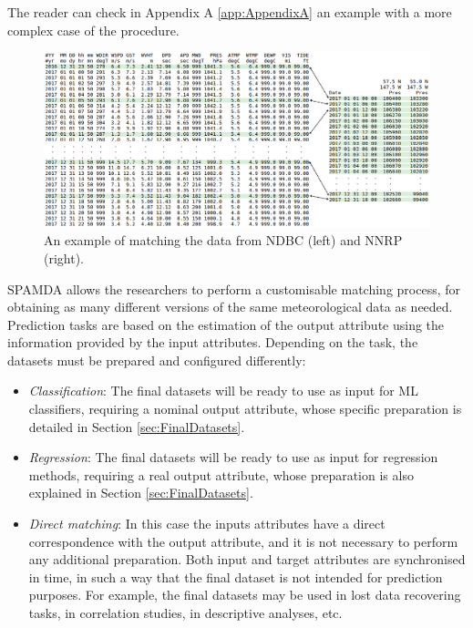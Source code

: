 \documentclass[review]{elsarticle}
\begin{document}
				The reader can check in Appendix A \ref{app:AppendixA} an example with a more complex case of the procedure.
				\begin{figure}[ht!]
					\centering
					\includegraphics[scale=0.38]{figures/FigureMatchingProcess.png}
					\caption{An example of matching the data from NDBC (left) and NNRP (right).}
					\label{fig:matchingProcess}
				\end{figure}
				
				SPAMDA allows the researchers to perform a customisable matching process, for obtaining as many different versions of the same meteorological data as needed.
				Prediction tasks are based on the estimation of the output attribute using the information provided by the input attributes. Depending on the task, the datasets must be prepared and configured differently:				
				\begin{itemize}
					\item \textit{Classification}: The final datasets will be ready to use as input for ML classifiers, requiring a nominal output attribute, whose specific preparation is detailed in Section \ref{sec:FinalDatasets}.
					\item \textit{Regression}: The final datasets will be ready to use as input for regression methods, requiring a real output attribute, whose preparation is also explained in Section \ref{sec:FinalDatasets}.
					\item \textit{Direct matching}: In this case the inputs attributes have a direct correspondence with the output attribute, and it is not necessary to perform any additional preparation. Both input and target attributes are synchronised in time, in such a way that the final dataset is not intended for prediction purposes. For example, the final datasets may be used in lost data recovering tasks, in correlation studies, in descriptive analyses, etc.
				\end{itemize}
				
\end{document}
